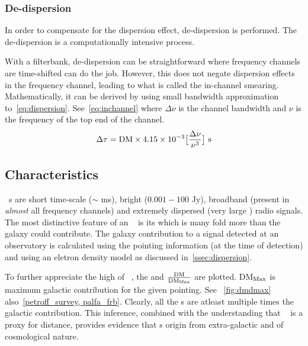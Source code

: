 \subsubsection {De-dispersion}
\label{sssub:dd}

\par In order to compensate for the dispersion effect, de-dispersion is performed. The de-dispersion is a computationally intensive process.
\par With a filterbank, de-dispersion can be straightforward where frequency channels are time-shifted can do the job. 
However, this does not negate dispersion effects in the frequency channel, leading to what is called the in-channel smearing.
Mathematically, it can be derived by using small bandwidth approximation to~\autoref{eq:dispersion}. 
See~\autoref{eq:inchannel} where $\Delta \nu$ is the channel bandwidth and $\nu$ is the frequency of the top end of the channel.
\begin{equation}
\label{eq:inchannel}
\Delta \tau = {\rm DM} \times 4.15 \times 10^{-3} \big[  \frac{\Delta \nu}{\nu^3}  \big]\ {\rm s}
\end{equation}

\subsection{Characteristics}
\label{ssub:frb}

\par \frb{}~s are short time-scale ($\sim$ ms), bright ($0.001 - 100$ Jy), broadband (present in \emph{almost} all frequency channels) and extremely dispersed (very large \dm) radio signals. 
The most distinctive feature of an \frb{}~ is its \dm which is many fold more than the galaxy could contribute. The galaxy contribution to a signal detected at an observatory is calculated using the pointing information (at the time of detection) and using an eletron density model as discussed in~\autoref{ssec:dispersion}.

\par To further appreciate the high \dm of \frb{}~, the \dm and $\frac{\rm DM}{{\rm DM}_{\rm Max}}$ are plotted. DM$_{\rm Max}$ is maximum galactic contribution for the given pointing. See ~\autoref{fig:dmdmax} also~\autoref{petroff_survey, palfa_frb}. Clearly, all the \frb{}s are atleast multiple times the galactic contribution. This inference, combined with the understanding that \dm~ is a proxy for distance, provides evidence that \frb{}s origin from extra-galactic and of cosmological nature.

